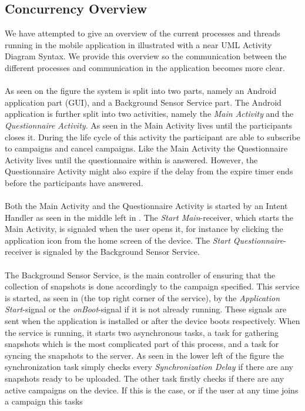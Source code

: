 \subsection{Concurrency Overview}
We have attempted to give an overview of the current processes and threads running in the mobile application in  illustrated with a near UML Activity Diagram Syntax. We provide this overview so the communication between the different processes and communication in the application becomes more clear.
\\\\
As seen on the figure the system is split into two parts, namely an Android application part (GUI), and a Background Sensor Service part. The Android application is further split into two activities, namely the \emph{Main Activity} and the \emph{Questionnaire Activity}. As seen in  the Main Activity lives until the participants closes it. During the life cycle of this activity the participant are able to subscribe to campaigns and cancel campaigns. Like the Main Activity the Questionnaire Activity lives until the questionnaire within is answered. However, the Questionnaire Activity might also expire if the delay from the expire timer ends before the participants have answered. 
\\\\
Both the Main Activity and the Questionnaire Activity is started by an Intent Handler as seen in the middle left in . The \emph{Start Main}-receiver, which starts the Main Activity, is signaled when the user opens it, for instance by clicking the application icon from the home screen of the device. The \emph{Start Questionnaire}-receiver is signaled by the Background Sensor Service.
\\\\
The Background Sensor Service, is the main controller of ensuring that the collection of snapshots is done accordingly to the campaign specified. This service is started, as seen in  (the top right corner of the service), by the \emph{Application Start}-signal or the \emph{onBoot}-signal if it is not already running. These signals are sent when the application is installed or after the device boots respectively. When the service is running, it starts two asynchronous tasks, a task for gathering snapshots which is the most complicated part of this process, and a task for syncing the snapshots to the server. As seen in the lower left of the figure the synchronization task simply checks every \emph{Synchronization Delay} if there are any snapshots ready to be uploaded. The other task firstly checks if there are any active campaigns on the device. If this is the case, or if the user at any time joins a campaign this tasks

